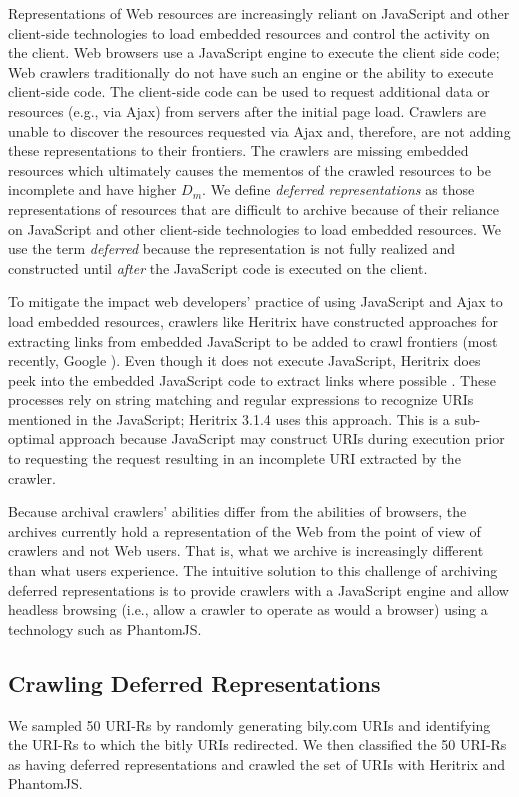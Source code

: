 Representations of Web resources are increasingly reliant on JavaScript and other client-side technologies to load embedded resources and control the activity on the client. Web browsers use a JavaScript engine to execute the client side code; Web crawlers traditionally do not have such an engine or the ability to execute client-side code. The client-side code can be used to request additional data or resources (e.g., via Ajax) from servers after the initial page load. Crawlers are unable to discover the resources requested via Ajax and, therefore, are not adding these representations to their frontiers. The crawlers are missing embedded resources which ultimately causes the mementos of the crawled resources to be incomplete and have higher $D_m$. We define \emph{deferred representations} as those representations of resources that are difficult to archive because of their reliance on JavaScript and other client-side technologies to load embedded resources. We use the term \emph{deferred} because the representation is not fully realized and constructed until \emph{after} the JavaScript code is executed on the client. 

To mitigate the impact web developers' practice of using JavaScript and Ajax to load embedded resources, crawlers like Heritrix have constructed approaches for extracting links from embedded JavaScript to be added to crawl frontiers (most recently, Google \cite{googleJS}). Even though it does not execute JavaScript, Heritrix does peek into the embedded JavaScript code to extract links where possible \cite{htrixJS}. These processes rely on string matching and regular expressions to recognize URIs mentioned in the JavaScript; Heritrix 3.1.4 uses this approach. This is a sub-optimal approach because JavaScript may construct URIs during execution prior to requesting the request resulting in an incomplete URI extracted by the crawler.

Because archival crawlers' abilities differ from the abilities of browsers, the archives currently hold a representation of the Web from the point of view of crawlers and not Web users. That is, what we archive is increasingly different than what users experience. The intuitive solution to this challenge of archiving deferred representations is to provide crawlers with a JavaScript engine and allow headless browsing (i.e., allow a crawler to operate as would a browser) using a technology such as PhantomJS.

\subsection{Crawling Deferred Representations}
\label{crawlDeferred}
We sampled 50 URI-Rs by randomly generating bily.com URIs and identifying the URI-Rs to which the bitly URIs redirected. We then classified the 50 URI-Rs as having deferred representations and crawled the set of URIs with Heritrix and PhantomJS. 

